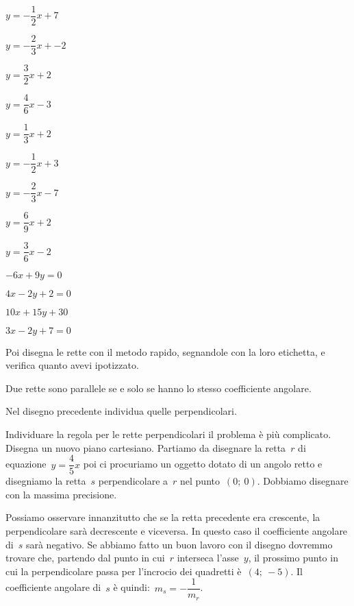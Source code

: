 \begin{multicols}{4}
 \TabPositions{0.6cm}
 \begin{enumeratea}
 \item \(y=-\dfrac{1}{2}x + 7\)
 \item \(y=-\dfrac{2}{3}x + -2\)
 \item \(y=\dfrac{3}{2}x + 2\)
 \item \(y=\dfrac{4}{6}x - 3\)
 \item \(y=\dfrac{1}{3}x + 2\)
 \item \(y=-\dfrac{1}{2}x + 3\)
 \item \(y=-\dfrac{2}{3}x - 7\)
 \item \(y=\dfrac{6}{9}x + 2\)
 \item \(y=\dfrac{3}{6}x - 2\)
 \item \(-6x + 9y = 0\) \\[-.8em]
 \item \(4x - 2y + 2 = 0\) \\[-.8em]
 \item \(10x + 15y + 30\) \\[-.8em]
 \item \(3x -2y + 7 = 0\)
 \end{enumeratea}
\end{multicols}

Poi disegna le rette con il metodo rapido, segnandole con la loro etichetta, 
e verifica quanto avevi ipotizzato. 

\begin{definizione}
Due rette sono parallele se e solo se hanno lo stesso coefficiente angolare.
\end{definizione}

Nel disegno precedente individua quelle perpendicolari.

Individuare la regola per le rette perpendicolari il problema è più 
complicato. 
Disegna un nuovo piano cartesiano.
Partiamo da disegnare la retta~\(r\) di equazione~\(y = \dfrac{4}{5} x\) poi 
ci procuriamo un oggetto dotato di un angolo retto e disegniamo la 
retta~\(s\) perpendicolare a~\(r\) nel punto~\((0;~0)\). 
Dobbiamo disegnare con la massima precisione. 

Possiamo osservare innanzitutto che se la retta precedente era crescente, la 
perpendicolare sarà decrescente e viceversa. In questo caso il coefficiente 
angolare di~\(s\) sarà negativo. 
Se abbiamo fatto un buon lavoro con il disegno dovremmo trovare che, partendo 
dal punto in cui~\(r\) interseca l'asse~\(y\), il 
prossimo punto in cui la perpendicolare passa per l'incrocio dei quadretti 
è~\((4;~-5)\). Il coefficiente angolare di~\(s\) è 
quindi:~\(m_s = - \dfrac{1}{m_r}\).

